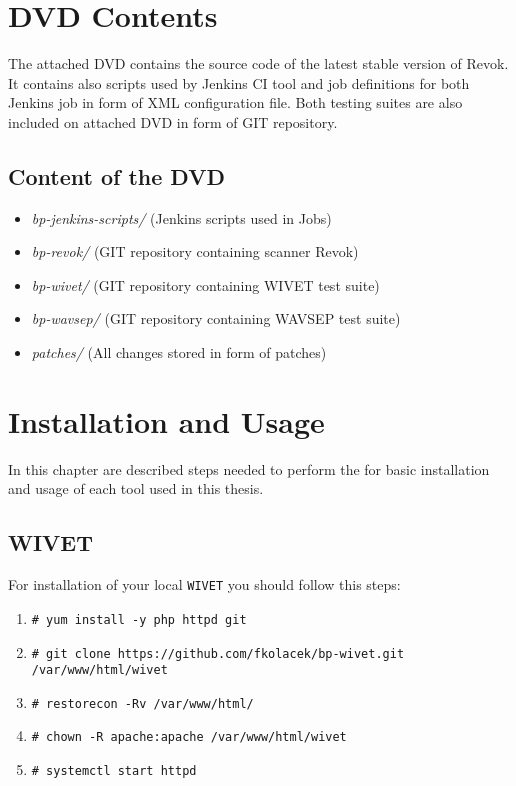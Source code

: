 \chapter{DVD Contents}\label{app:cd}

The attached DVD contains the source code of the latest stable version of Revok. It contains also scripts used by Jenkins CI tool and job definitions for both Jenkins job in form of XML configuration file. Both testing suites are also included on attached DVD in form of GIT repository.

\section{Content of the DVD}

			\begin{itemize}
				\item \textit{bp-jenkins-scripts/} (Jenkins scripts used in Jobs)
				\item \textit{bp-revok/} (GIT repository containing scanner Revok)
				\item \textit{bp-wivet/} (GIT repository containing WIVET test suite)
				\item \textit{bp-wavsep/} (GIT repository containing WAVSEP test suite)
				\item \textit{patches/} (All changes stored in form of patches)				
			\end{itemize}

\chapter{Installation and Usage}\label{app:installation-and-usage}

In this chapter are described steps needed to perform the for basic installation and usage of each tool used in this thesis.

	\section{WIVET}\label{app:installation-of-wivet}

	For installation of your local \texttt{WIVET} you should follow this steps:
	
	\begin{enumerate}
		\item \texttt{\# yum install -y php httpd git}
		\item \texttt{\# git clone https://github.com/fkolacek/bp-wivet.git /var/www/html/wivet}
		\item \texttt{\# restorecon -Rv /var/www/html/}
		\item \texttt{\# chown -R apache:apache /var/www/html/wivet}
		\item \texttt{\# systemctl start httpd}				
	\end{enumerate}
	
